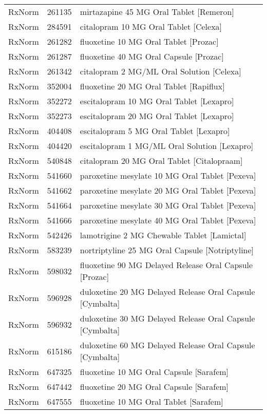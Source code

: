 \begin{longtable}{p{}p{}p{}}
  RxNorm & 261135 & mirtazapine 45 MG Oral Tablet [Remeron] \\ 
  RxNorm & 284591 & citalopram 10 MG Oral Tablet [Celexa] \\ 
  RxNorm & 261282 & fluoxetine 10 MG Oral Tablet [Prozac] \\ 
  RxNorm & 261287 & fluoxetine 40 MG Oral Capsule [Prozac] \\ 
  RxNorm & 261342 & citalopram 2 MG/ML Oral Solution [Celexa] \\ 
  RxNorm & 352004 & fluoxetine 20 MG Oral Tablet [Rapiflux] \\ 
  RxNorm & 352272 & escitalopram 10 MG Oral Tablet [Lexapro] \\ 
  RxNorm & 352273 & escitalopram 20 MG Oral Tablet [Lexapro] \\ 
  RxNorm & 404408 & escitalopram 5 MG Oral Tablet [Lexapro] \\ 
  RxNorm & 404420 & escitalopram 1 MG/ML Oral Solution [Lexapro] \\ 
  RxNorm & 540848 & citalopram 20 MG Oral Tablet [Citalopraam] \\ 
  RxNorm & 541660 & paroxetine mesylate 10 MG Oral Tablet [Pexeva] \\ 
  RxNorm & 541662 & paroxetine mesylate 20 MG Oral Tablet [Pexeva] \\ 
  RxNorm & 541664 & paroxetine mesylate 30 MG Oral Tablet [Pexeva] \\ 
  RxNorm & 541666 & paroxetine mesylate 40 MG Oral Tablet [Pexeva] \\ 
  RxNorm & 542426 & lamotrigine 2 MG Chewable Tablet [Lamictal] \\ 
  RxNorm & 583239 & nortriptyline 25 MG Oral Capsule [Notriptyline] \\ 
  RxNorm & 598032 & fluoxetine 90 MG Delayed Release Oral Capsule [Prozac] \\ 
  RxNorm & 596928 & duloxetine 20 MG Delayed Release Oral Capsule [Cymbalta] \\ 
  RxNorm & 596932 & duloxetine 30 MG Delayed Release Oral Capsule [Cymbalta] \\ 
  RxNorm & 615186 & duloxetine 60 MG Delayed Release Oral Capsule [Cymbalta] \\ 
  RxNorm & 647325 & fluoxetine 10 MG Oral Capsule [Sarafem] \\ 
  RxNorm & 647442 & fluoxetine 20 MG Oral Capsule [Sarafem] \\ 
  RxNorm & 647555 & fluoxetine 10 MG Oral Tablet [Sarafem] \\ 

\end{longtable}
